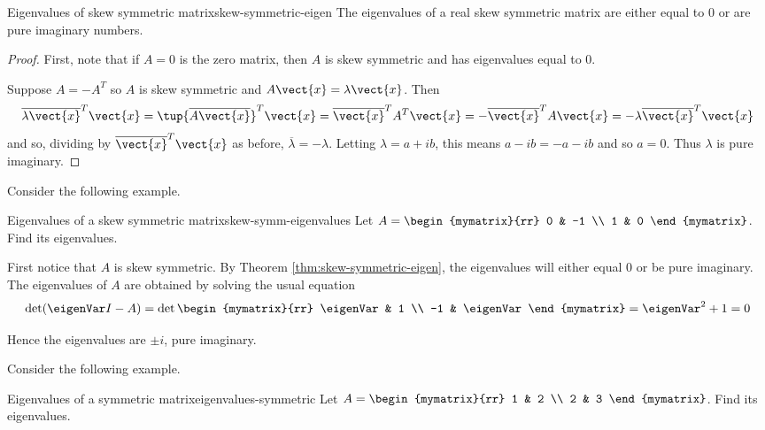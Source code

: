 \begin{theorem}{Eigenvalues of skew symmetric matrix}{skew-symmetric-eigen}
The eigenvalues of a real skew symmetric matrix are either equal to $0$ or are pure imaginary numbers.
\end{theorem}

\begin{proof}
First, note that if $A=0$ is the zero matrix, then $A$ is skew symmetric and has eigenvalues equal to $0$. 

Suppose $A=-A^{T}$ so $A$ is skew symmetric and $A\vect{x}=\lambda 
\vect{x}$. Then 
\begin{equation*}
\overline{\lambda \vect{x}}^{T}\vect{x}=\tup{\overline{A
\vect{x}}} ^{T}\vect{x}=\overline{\vect{x}}^{T}A^{T}\vect{x}=-
\overline{\vect{x}}^{T}A\vect{x}=-\lambda \overline{\vect{x}}^{T}
\vect{x}
\end{equation*}
and so, dividing by $\overline{\vect{x}}^{T}\vect{x}$ as before, $
\overline{\lambda }=-\lambda$. Letting $\lambda =a+ib$, this means $
a-ib=-a-ib$ and so $a=0$. Thus $\lambda $ is pure imaginary. 
\end{proof}

Consider the following example. 

\begin{example}{Eigenvalues of a skew symmetric matrix}{skew-symm-eigenvalues}
Let $A=\begin{mymatrix}{rr}
0 & -1 \\
1 & 0
\end{mymatrix}$.  Find its eigenvalues.
\end{example}

\begin{solution}
First notice that $A$ is skew symmetric. By Theorem \ref{thm:skew-symmetric-eigen}, the eigenvalues will either equal $0$ or be pure imaginary.  The eigenvalues of $A$ are obtained by solving the usual equation 
\[
\det (\eigenVar I - A ) = 
\det \begin{mymatrix}{rr}
\eigenVar & 1 \\ 
-1 & \eigenVar
\end{mymatrix} =\eigenVar ^{2}+1=0
\]

Hence the eigenvalues are $\pm i$, pure
imaginary.
\end{solution}

Consider the following example.

\begin{example}{Eigenvalues of a symmetric matrix}{eigenvalues-symmetric}
Let $A=\begin{mymatrix}{rr}
1 & 2 \\
2 & 3
\end{mymatrix}$. Find its eigenvalues.
\end{example}

